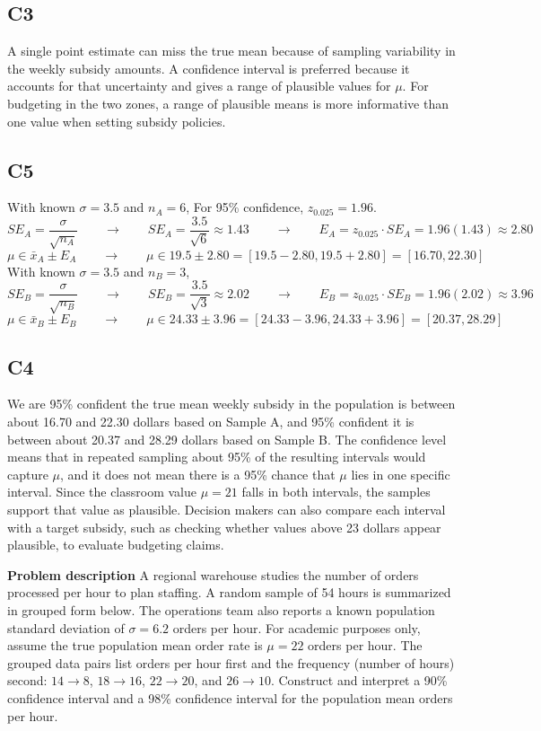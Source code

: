 \begin{ExamProblems}
		\subsection*{C3}
		A single point estimate can miss the true mean because of sampling variability in the weekly subsidy amounts. A confidence interval is preferred because it accounts for that uncertainty and gives a range of plausible values for $\mu$. For budgeting in the two zones, a range of plausible means is more informative than one value when setting subsidy policies.

		\subsection*{C5}
		With known $\sigma = 3.5$ and $n_A = 6$, For 95\% confidence, $z_{0.025}=1.96$.
		\[
		SE_A = \frac{\sigma}{\sqrt{n_A}}  \qquad \longrightarrow \qquad SE_A = \frac{3.5}{\sqrt{6}} \approx 1.43  \qquad \longrightarrow \qquad  E_A = z_{0.025} \cdot SE_A = 1.96(1.43) \approx 2.80
		\]
		\[
		\mu \in \bar{x}_A \pm E_A  \qquad \longrightarrow \qquad \mu \in 19.5 \pm 2.80 = [19.5 - 2.80, 19.5 + 2.80] = [16.70, 22.30]
		\]
		With known $\sigma = 3.5$ and $n_B = 3$,
		\[
		SE_B = \frac{\sigma}{\sqrt{n_B}}  \qquad \longrightarrow \qquad SE_B = \frac{3.5}{\sqrt{3}} \approx 2.02  \qquad \longrightarrow \qquad E_B = z_{0.025} \cdot SE_B = 1.96(2.02) \approx 3.96
		\]
		\[
		\mu \in \bar{x}_B \pm E_B   \qquad \longrightarrow \qquad \mu \in 24.33 \pm 3.96 = [24.33 - 3.96, 24.33 + 3.96] = [20.37, 28.29]
		\]

		\subsection*{C4}
		We are 95\% confident the true mean weekly subsidy in the population is between about 16.70 and 22.30 dollars based on Sample A, and 95\% confident it is between about 20.37 and 28.29 dollars based on Sample B. The confidence level means that in repeated sampling about 95\% of the resulting intervals would capture $\mu$, and it does not mean there is a 95\% chance that $\mu$ lies in one specific interval. Since the classroom value $\mu = 21$ falls in both intervals, the samples support that value as plausible. Decision makers can also compare each interval with a target subsidy, such as checking whether values above 23 dollars appear plausible, to evaluate budgeting claims.
		
		\newpage
		\item
		\textbf{Problem description}
		A regional warehouse studies the number of orders processed per hour to plan staffing.
		A random sample of 54 hours is summarized in grouped form below. The operations team also reports a known population standard deviation of \(\sigma = 6.2\) orders per hour.
		For academic purposes only, assume the true population mean order rate is \(\mu = 22\) orders per hour.
		The grouped data pairs list orders per hour first and the frequency (number of hours) second: \(14 \rightarrow 8\), \(18 \rightarrow 16\), \(22 \rightarrow 20\), and \(26 \rightarrow 10\).
		Construct and interpret a 90\% confidence interval and a 98\% confidence interval for the population mean orders per hour.


\end{ExamProblems}
